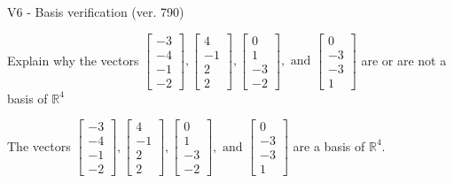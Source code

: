 \begin{exercise}
  \begin{exerciseTitle}V6 - Basis verification (ver. 790)\end{exerciseTitle}
  \begin{exerciseStatement}
    Explain why the vectors \(\left[\begin{array}{r}
-3 \\
-4 \\
-1 \\
-2
\end{array}\right] , \left[\begin{array}{r}
4 \\
-1 \\
2 \\
2
\end{array}\right] , \left[\begin{array}{r}
0 \\
1 \\
-3 \\
-2
\end{array}\right] , \text{ and } \left[\begin{array}{r}
0 \\
-3 \\
-3 \\
1
\end{array}\right]\) are or are not a basis of \(\mathbb{R}^4\)	


  \end{exerciseStatement}
  \begin{exerciseAnswer}
   The vectors \(\left[\begin{array}{r}
-3 \\
-4 \\
-1 \\
-2
\end{array}\right] , \left[\begin{array}{r}
4 \\
-1 \\
2 \\
2
\end{array}\right] , \left[\begin{array}{r}
0 \\
1 \\
-3 \\
-2
\end{array}\right] , \text{ and } \left[\begin{array}{r}
0 \\
-3 \\
-3 \\
1
\end{array}\right]\) 
  	 are  a basis of \(\mathbb{R}^4\).
  


  \end{exerciseAnswer}
\end{exercise}